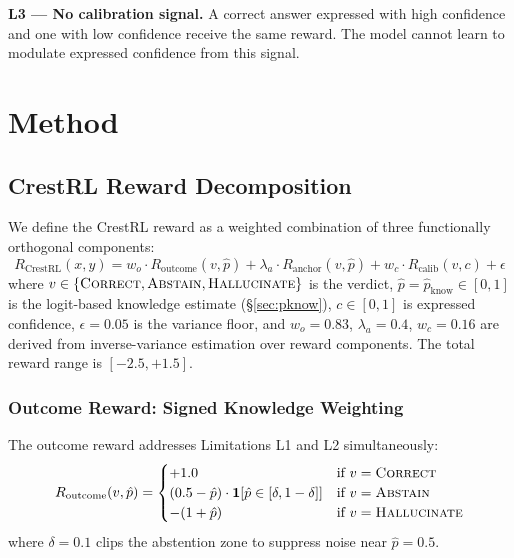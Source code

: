 \documentclass[11pt]{article}
\begin{document}
\textbf{L3 — No calibration signal.} A correct answer expressed with high confidence and one with low confidence receive the same reward. The model cannot learn to modulate expressed confidence from this signal.

\section{Method}
\label{sec:method}

\subsection{CrestRL Reward Decomposition}

We define the CrestRL reward as a weighted combination of three functionally orthogonal components:
\begin{equation}
R_{\text{CrestRL}}(x, y) = w_o \cdot R_{\text{outcome}}(v, \hat{p}) + \lambda_a \cdot R_{\text{anchor}}(v, \hat{p}) + w_c \cdot R_{\text{calib}}(v, c) + \epsilon
\label{eq:crestrl}
\end{equation}
where $v \in \{\textsc{Correct}, \textsc{Abstain}, \textsc{Hallucinate}\}$ is the verdict, $\hat{p} = \hat{p}_{\text{know}} \in [0,1]$ is the logit-based knowledge estimate (\S\ref{sec:pknow}), $c \in [0,1]$ is expressed confidence, $\epsilon = 0.05$ is the variance floor, and $w_o = 0.83$, $\lambda_a = 0.4$, $w_c = 0.16$ are derived from inverse-variance estimation over reward components. The total reward range is $[-2.5, +1.5]$.

\subsubsection{Outcome Reward: Signed Knowledge Weighting}
\label{sec:outcome}

The outcome reward addresses Limitations L1 and L2 simultaneously:
\begin{equation}
R_{\text{outcome}}(v, \hat{p}) = \begin{cases}
+1.0 & \text{if } v = \textsc{Correct} \\
(0.5 - \hat{p}) \cdot \mathbf{1}[\hat{p} \in [\delta, 1-\delta]] & \text{if } v = \textsc{Abstain} \\
-(1 + \hat{p}) & \text{if } v = \textsc{Hallucinate}
\end{cases}
\label{eq:outcome}
\end{equation}
where $\delta = 0.1$ clips the abstention zone to suppress noise near $\hat{p} = 0.5$.
\end{document}
